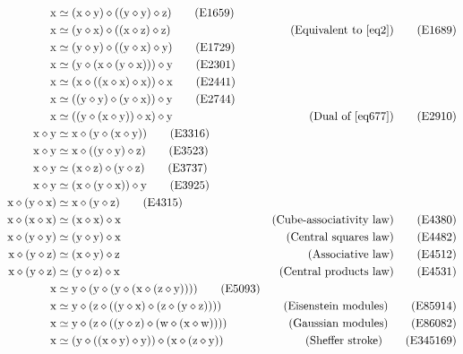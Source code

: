 \documentclass[12pt]{amsart}
\theoremstyle{definition}
\newcommand{\x}{\mathrm{x}}
\newcommand{\y}{\mathrm{y}}
\newcommand{\z}{\mathrm{z}}
\newcommand{\w}{\mathrm{w}}
\newcommand{\op}{\diamond}
\newcommand{\formaleq}{\simeq}
\begin{document}
\begin{align}
    \x &\formaleq (\x \op \y) \op ((\y \op \y) \op \z) \label{eq1659}\tag{E1659} \\
    \x &\formaleq (\y \op \x) \op ((\x \op \z) \op \z) & \hbox{(Equivalent to~\eqref{eq2})} \label{eq1689}\tag{E1689} \\
    \x &\formaleq (\y \op \y) \op ((\y \op \x) \op \y) \label{eq1729}\tag{E1729} \\
    \x &\formaleq (\y \op (\x \op (\y \op \x))) \op \y \label{eq2301}\tag{E2301} \\
        \x &\formaleq (\x \op ((\x \op \x) \op \x)) \op \x \label{eq2441}\tag{E2441} \\
        \x &\formaleq ((\y \op \y) \op (\y \op \x)) \op \y \label{eq2744}\tag{E2744} \\
        \x &\formaleq ((\y \op (\x \op \y)) \op \x) \op \y & \hbox{(Dual of \eqref{eq677})} \label{eq2910}\tag{E2910} \\
        \x \op \y &\formaleq \x \op (\y \op (\x \op \y)) \label{eq3316}\tag{E3316} \\
        \x \op \y &\formaleq \x \op ((\y \op \y) \op \z) \label{eq3523}\tag{E3523} \\
        \x \op \y &\formaleq (\x \op \z) \op (\y \op \z) \label{eq3737}\tag{E3737} \\
        \x \op \y &\formaleq (\x \op (\y \op \x)) \op \y \label{eq3925}\tag{E3925} \\
        \x \op (\y \op \x) &\formaleq \x \op (\y \op \z) \label{eq4315}\tag{E4315} \\
        \x \op (\x \op \x) &\formaleq (\x \op \x) \op \x & \hbox{(Cube-associativity law)} \label{eq4380}\tag{E4380} \\
        \x \op (\y \op \y) &\formaleq (\y \op \y) \op \x & \hbox{(Central squares law)} \label{eq4482}\tag{E4482} \\
        \x \op (\y \op \z) &\formaleq (\x \op \y) \op \z & \hbox{(Associative law)} \label{eq4512}\tag{E4512} \\
        \x \op (\y \op \z) &\formaleq (\y \op \z) \op \x & \hbox{(Central products law)} \label{eq4531}\tag{E4531} \\
        \x &\formaleq \y \op (\y \op (\y \op (\x \op (\z \op \y)))) \label{eq5093}\tag{E5093} \\
        \x &\formaleq \y \op (\z \op ((\y \op \x) \op (\z \op (\y \op \z)))) & \hbox{(Eisenstein modules)} \label{eq85914} \tag{E85914} \\
        \x &\formaleq \y \op (\z \op ((\y \op \z) \op (\w \op (\x \op \w)))) & \hbox{(Gaussian modules)} \label{eq86082} \tag{E86082} \\
        \x &\formaleq (\y \op ((\x \op \y) \op \y)) \op (\x \op (\z \op \y)) & \hbox{(Sheffer stroke)} \label{eq345169}\tag{E345169}
\end{align}
\end{document}
